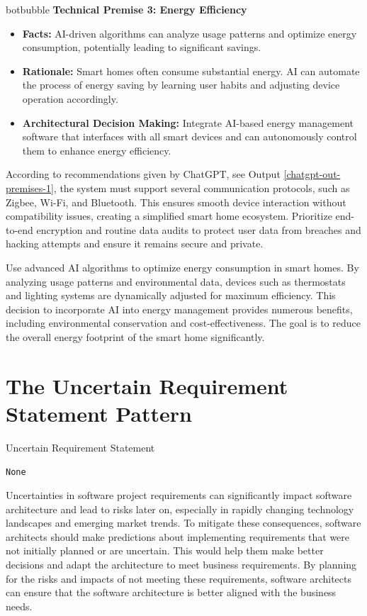 \begin{chatout}{botbubble}{}
\noindent
\textbf{Technical Premise 3: Energy Efficiency}
\begin{itemize}
    \item \textbf{Facts:} AI-driven algorithms can analyze usage patterns and optimize energy consumption, potentially leading to significant savings.
    \item \textbf{Rationale:} Smart homes often consume substantial energy. AI can automate the process of energy saving by learning user habits and adjusting device operation accordingly.
    \item \textbf{Architectural Decision Making:} Integrate AI-based energy management software that interfaces with all smart devices and can autonomously control them to enhance energy efficiency.    
\end{itemize}
\end{chatout}

According to recommendations given by ChatGPT, see Output \ref{chatgpt-out-premises-1}, the system must support several communication protocols, such as Zigbee, Wi-Fi, and Bluetooth. This ensures smooth device interaction without compatibility issues, creating a simplified smart home ecosystem.
Prioritize end-to-end encryption and routine data audits to protect user data from breaches and hacking attempts and ensure it remains secure and private.

Use advanced AI algorithms to optimize energy consumption in smart homes. By analyzing usage patterns and environmental data, devices such as thermostats and lighting systems are dynamically adjusted for maximum efficiency. This decision to incorporate AI into energy management provides numerous benefits, including environmental conservation and cost-effectiveness. The goal is to reduce the overall energy footprint of the smart home significantly.

\begin{center}
                       
\end{center}

\section{The Uncertain Requirement Statement Pattern} \label{sec:uncertain-requirement-statement}

 Uncertain Requirement Statement

\texttt{None}

 Uncertainties in software project requirements can significantly impact software architecture and lead to risks later on, especially in rapidly changing technology landscapes and emerging market trends. To mitigate these consequences, software architects should make predictions about implementing requirements that were not initially planned or are uncertain. This would help them make better decisions and adapt the architecture to meet business requirements. By planning for the risks and impacts of not meeting these requirements, software architects can ensure that the software architecture is better aligned with the business needs.

